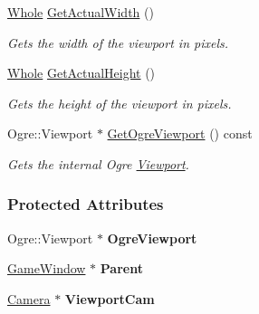 \begin{DoxyCompactItemize}
\hyperlink{namespacephys_a460f6bc24c8dd347b05e0366ae34f34a}{Whole} \hyperlink{classphys_1_1Viewport_a301262e5da6926296241f0e2cc2de7d2}{GetActualWidth} ()
\begin{DoxyCompactList}\small\item\em Gets the width of the viewport in pixels. \item\end{DoxyCompactList}\item 
\hyperlink{namespacephys_a460f6bc24c8dd347b05e0366ae34f34a}{Whole} \hyperlink{classphys_1_1Viewport_a1eee22594548a38910dee8e838e6449d}{GetActualHeight} ()
\begin{DoxyCompactList}\small\item\em Gets the height of the viewport in pixels. \item\end{DoxyCompactList}\item 
Ogre::Viewport $\ast$ \hyperlink{classphys_1_1Viewport_a005b39a37464c4f4a365c2bdb08ffb04}{GetOgreViewport} () const 
\begin{DoxyCompactList}\small\item\em Gets the internal Ogre \hyperlink{classphys_1_1Viewport}{Viewport}. \item\end{DoxyCompactList}\end{DoxyCompactItemize}
\subsubsection*{Protected Attributes}
\begin{DoxyCompactItemize}
\item 
\hypertarget{classphys_1_1Viewport_a5251d485654d73414b9efdbb73015c83}{
Ogre::Viewport $\ast$ {\bfseries OgreViewport}}
\label{d5/d62/classphys_1_1Viewport_a5251d485654d73414b9efdbb73015c83}

\item 
\hypertarget{classphys_1_1Viewport_a833d36e97945498b2a4766c47c756e2f}{
\hyperlink{classphys_1_1GameWindow}{GameWindow} $\ast$ {\bfseries Parent}}
\label{d5/d62/classphys_1_1Viewport_a833d36e97945498b2a4766c47c756e2f}

\item 
\hypertarget{classphys_1_1Viewport_a3eb772321faeee0f76a80329ddc61885}{
\hyperlink{classphys_1_1Camera}{Camera} $\ast$ {\bfseries ViewportCam}}
\label{d5/d62/classphys_1_1Viewport_a3eb772321faeee0f76a80329ddc61885}

\end{DoxyCompactItemize}


